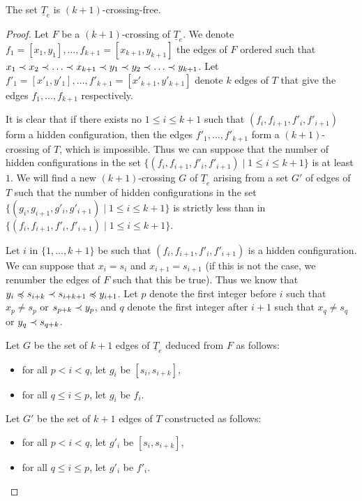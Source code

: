 \documentclass[12pt]{amsart}
\begin{document}
\begin{lemma}
The set $\underline{T}_e$ is $(k+1)$-crossing-free.
\end{lemma}

\begin{proof}
Let $F$ be a $(k+1)$-crossing of $\underline{T}_e$. We denote $f_1=[x_1,y_1],\ldots,f_{k+1}=[x_{k+1},y_{k+1}]$ the edges of $F$ ordered such that $x_1\prec x_2\prec\ldots\prec x_{k+1}\prec y_1\prec y_2\prec \ldots\prec y_{k+1}$. Let $f'_1=[x'_1,y'_1],\ldots,f'_{k+1}=[x'_{k+1},y'_{k+1}]$ denote $k$ edges of $T$ that give the edges $f_1,\ldots,f_{k+1}$ respectively.

It is clear that if there exists no $1\le i\le k+1$ such that $(f_i,f_{i+1},f'_i,f'_{i+1})$ form a hidden configuration, then the edges $f'_1,\ldots,f'_{k+1}$ form a $(k+1)$-crossing of $T$, which is impossible. Thus we can suppose that the number of hidden configurations in the set $\{(f_i,f_{i+1},f'_i,f'_{i+1})\;|\; 1\le i\le k+1\}$ is at least $1$. We will find a new $(k+1)$-crossing $G$ of $\underline{T}_e$ arising from a set $G'$ of edges of $T$ such that the number of hidden configurations in the set $\{(g_i,g_{i+1},g'_i,g'_{i+1})\;|\; 1\le i\le k+1\}$ is strictly less than in $\{(f_i,f_{i+1},f'_i,f'_{i+1})\;|\; 1\le i\le k+1\}$.

Let $i$ in $\{1,\ldots,k+1\}$ be such that $(f_i,f_{i+1},f'_i,f'_{i+1})$ is a hidden configuration. We can suppose that $x_i=s_i$ and $x_{i+1}=s_{i+1}$ (if this is not the case, we renumber the edges of $F$ such that this be true). Thus we know that $y_i\preccurlyeq s_{i+k}\prec s_{i+k+1}\preccurlyeq y_{i+1}$. Let $p$ denote the first integer before $i$ such that $x_p \ne s_p$ or $s_{p+k}\prec y_p$, and $q$ denote the first integer after $i+1$ such that $x_q \ne s_q$ or $y_q\prec s_{q+k}$.

Let $G$ be the set of $k+1$ edges of $\underline{T}_e$ deduced from $F$ as follows:
\begin{itemize}
\item for all $p<i<q$, let $g_i$ be $[s_i,s_{i+k}]$,
\item for all $q\le i\le p$, let $g_i$ be $f_i$.
\end{itemize}
Let $G'$ be the set of $k+1$ edges of $T$ constructed as follows:
\begin{itemize}
\item for all $p<i<q$, let $g'_i$ be $[s_i,s_{i+k}]$,
\item for all $q\le i\le p$, let $g'_i$ be $f'_i$.
\end{itemize}
		

\end{proof}
\end{document}
